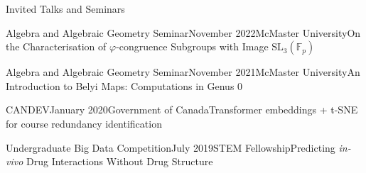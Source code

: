 \begin{rSection}{Invited Talks and Seminars}


\begin{rSubsection}{Algebra and Algebraic Geometry Seminar}{November 2022}{McMaster University}{On the Characterisation of $\varphi$-congruence Subgroups with Image $\mathrm{SL}_{3}(\mathbb{F}_p)$}
\end{rSubsection}
\smallskip

\begin{rSubsection}{Algebra and Algebraic Geometry Seminar}{November 2021}{McMaster University}{An Introduction to Belyi Maps: Computations in Genus 0}
\end{rSubsection}
\smallskip

\begin{rSubsection}{CANDEV}{January 2020}{Government of Canada}{Transformer embeddings + t-SNE for course redundancy identification}
\end{rSubsection}
\smallskip

\begin{rSubsection}{Undergraduate Big Data Competition}{July 2019}{STEM Fellowship}{Predicting \textit{in-vivo} Drug Interactions Without Drug Structure}
\end{rSubsection}


\end{rSection}
